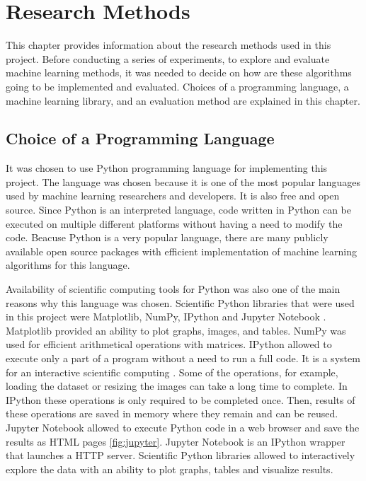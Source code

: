 \chapter{Research Methods}

This chapter provides information about the research methods used in this project. Before conducting a series of experiments, to explore and evaluate machine learning methods, it was needed to decide on how are these algorithms going to be implemented and evaluated. Choices of a programming language,  a machine learning library, and an evaluation method are explained in this chapter.

\section{Choice of a Programming Language}

 It was chosen to use Python programming language for implementing this project. The language was chosen because it is one of the most popular languages used by machine learning researchers and developers. It is also free and open source. Since Python is an interpreted language, code written in Python can be executed on multiple different platforms without having a need to modify the code. Beacuse  Python is a very popular language, there are many publicly available  open source packages with efficient implementation of machine learning algorithms for this language.

Availability of scientific computing tools for Python was also one of the main reasons why this language was chosen. Scientific Python libraries that were used in this project were Matplotlib, NumPy, IPython and Jupyter Notebook \citep{scipy}. Matplotlib provided an ability to plot graphs, images, and tables. NumPy was used for efficient arithmetical operations with matrices. IPython allowed to execute only a part of a program without a need to run a full code. It is a system for an interactive scientific computing \citep{ipython}. Some of the operations, for example, loading the dataset or resizing the images can take a long time to complete. In IPython these operations is only required to be completed once. Then, results of these operations are saved in memory where they remain and can be reused. Jupyter Notebook allowed to execute Python code in a web browser and  save the results as HTML pages \autoref{fig:jupyter}. Jupyter Notebook is an IPython wrapper that launches a HTTP server. Scientific Python libraries allowed to interactively explore the data with an  ability to plot graphs, tables and visualize  results.

